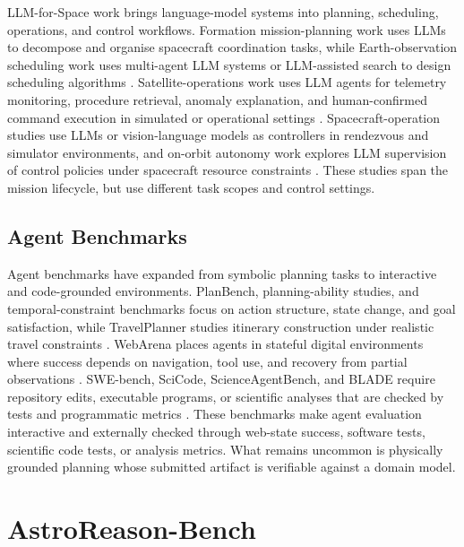\documentclass[11pt]{article}
\begin{document}
LLM-for-Space work brings language-model systems into planning, scheduling, operations, and control workflows. Formation mission-planning work uses LLMs to decompose and organise spacecraft coordination tasks, while Earth-observation scheduling work uses multi-agent LLM systems or LLM-assisted search to design scheduling algorithms \citep{zhang2025large,chen2025large,evalns_2026_llm_satellite_scheduling}. Satellite-operations work uses LLM agents for telemetry monitoring, procedure retrieval, anomaly explanation, and human-confirmed command execution in simulated or operational settings \citep{campanelli_2025_llm_satellite_ops,esa_2024_a2i_roadmap}. Spacecraft-operation studies use LLMs or vision-language models as controllers in rendezvous and simulator environments, and on-orbit autonomy work explores LLM supervision of control policies under spacecraft resource constraints \citep{carrasco_2025_llm_autonomous_spacecraft,mousist_2025_astrea}. These studies span the mission lifecycle, but use different task scopes and control settings.

\subsection{Agent Benchmarks}

Agent benchmarks have expanded from symbolic planning tasks to interactive and code-grounded environments. PlanBench, planning-ability studies, and temporal-constraint benchmarks focus on action structure, state change, and goal satisfaction, while TravelPlanner studies itinerary construction under realistic travel constraints \citep{valmeekam2023planning,valmeekam2023planbench,ding2025tcp,xie2024travelplanner}. WebArena places agents in stateful digital environments where success depends on navigation, tool use, and recovery from partial observations \citep{zhouwebarena}. SWE-bench, SciCode, ScienceAgentBench, and BLADE require repository edits, executable programs, or scientific analyses that are checked by tests and programmatic metrics \citep{jimenezswe,scicode_2024,scienceagentbench_2025,blade_2024}. These benchmarks make agent evaluation interactive and externally checked through web-state success, software tests, scientific code tests, or analysis metrics. What remains uncommon is physically grounded planning whose submitted artifact is verifiable against a domain model.

\section{AstroReason-Bench}
\label{sec:benchmark}
\end{document}
